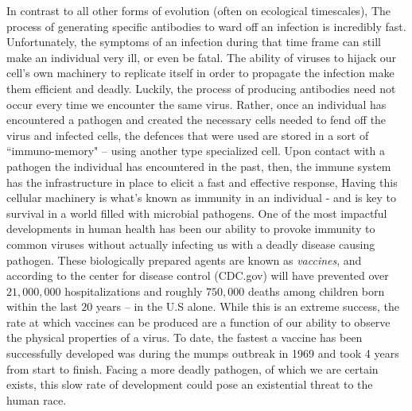 \documentclass{article}
\begin{document}
In contrast to all other forms of evolution (often on ecological timescales), 
The process of generating specific antibodies to ward off an infection is incredibly fast.
Unfortunately, the symptoms of an infection during that time frame can still make an individual very ill, or even be fatal.
The ability of viruses to hijack our cell's own machinery to replicate itself in order to propagate the infection make them efficient and deadly.
Luckily, the process of producing antibodies need not occur every time we encounter the same virus.
Rather, once an individual has encountered a pathogen and created the necessary cells needed to fend off the virus and infected cells,
the defences that were used are stored in a sort of ``immuno-memory" -- using another type specialized cell.
Upon contact with a pathogen the individual has encountered in the past, then,
the immune system has the infrastructure in place to elicit a fast and effective response, 
Having this cellular machinery is what's known as immunity in an individual - and is key to survival in a world filled with microbial pathogens.
One of the most impactful developments in human health has been our ability to provoke immunity to common
viruses without actually infecting us with a deadly disease causing pathogen.
These biologically prepared agents are known as \textit{vaccines}, 
and according to the center for disease control (CDC.gov) will have prevented over $21,000,000$ hospitalizations and roughly $750,000$
deaths among children born within the last $20$ years -- in the U.S alone.
While this is an extreme success, the rate at which vaccines can be produced are a function of our ability to observe the physical properties of a virus.
To date, the fastest a vaccine has been successfully developed was during the mumps outbreak in 1969 and took 4 years from start to finish.
Facing a more deadly pathogen, of which we are certain exists, this slow rate of development could pose an existential threat to the human race.

~
\end{document}
